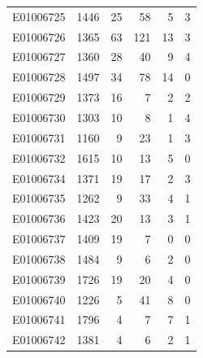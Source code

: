 \documentclass[
  letterpaper,
  DIV=11,
  numbers=noendperiod]{scrreprt}
\begin{document}
\begin{tabular}{lrrrrr}
E01006725     &    1446 &      25 &                    58 &                               5 &                       3 \\
E01006726     &    1365 &      63 &                   121 &                              13 &                       3 \\
E01006727     &    1360 &      28 &                    40 &                               9 &                       4 \\
E01006728     &    1497 &      34 &                    78 &                              14 &                       0 \\
E01006729     &    1373 &      16 &                     7 &                               2 &                       2 \\
E01006730     &    1303 &      10 &                     8 &                               1 &                       4 \\
E01006731     &    1160 &       9 &                    23 &                               1 &                       3 \\
E01006732     &    1615 &      10 &                    13 &                               5 &                       0 \\
E01006734     &    1371 &      19 &                    17 &                               2 &                       3 \\
E01006735     &    1262 &       9 &                    33 &                               4 &                       1 \\
E01006736     &    1423 &      20 &                    13 &                               3 &                       1 \\
E01006737     &    1409 &      19 &                     7 &                               0 &                       0 \\
E01006738     &    1484 &       9 &                     6 &                               2 &                       0 \\
E01006739     &    1726 &      19 &                    20 &                               4 &                       0 \\
E01006740     &    1226 &       5 &                    41 &                               8 &                       0 \\
E01006741     &    1796 &       4 &                     7 &                               7 &                       1 \\
E01006742     &    1381 &       4 &                     6 &                               2 &                       1 \\

\end{tabular}
\end{document}
